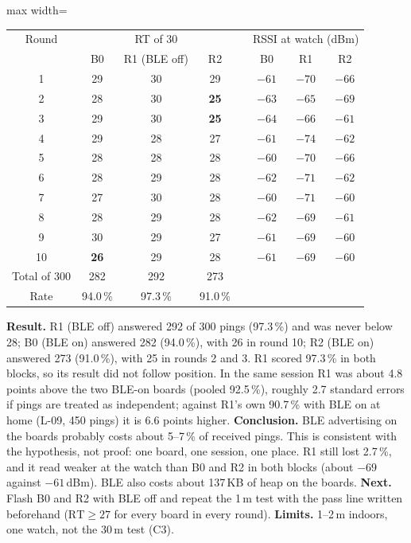 \IfFileExists{IEEEtran.cls}{\documentclass[conference]{IEEEtran}}{\documentclass[10pt,twocolumn]{article}}
\newcommand{\fitcol}[1]{\begin{adjustbox}{max width=\columnwidth}#1\end{adjustbox}}
\begin{document}
\begin{center}\footnotesize\setlength{\tabcolsep}{4pt}
\fitcol{\begin{tabular}{@{}c ccc c ccc@{}}
\toprule
Round & \multicolumn{3}{c}{RT of 30} & & \multicolumn{3}{c}{RSSI at watch (dBm)}\\
 & B0 & R1 (BLE off) & R2 & & B0 & R1 & R2\\
\midrule
1 & 29 & 30 & 29 & & $-61$ & $-70$ & $-66$\\
2 & 28 & 30 & \textbf{25} & & $-63$ & $-65$ & $-69$\\
3 & 29 & 30 & \textbf{25} & & $-64$ & $-66$ & $-61$\\
4 & 29 & 28 & 27 & & $-61$ & $-74$ & $-62$\\
5 & 28 & 28 & 28 & & $-60$ & $-70$ & $-66$\\
\midrule
6 & 28 & 29 & 28 & & $-62$ & $-71$ & $-62$\\
7 & 27 & 30 & 28 & & $-60$ & $-71$ & $-60$\\
8 & 28 & 29 & 28 & & $-62$ & $-69$ & $-61$\\
9 & 30 & 29 & 27 & & $-61$ & $-69$ & $-60$\\
10 & \textbf{26} & 29 & 28 & & $-61$ & $-69$ & $-60$\\
\midrule
Total of 300 & 282 & 292 & 273 & & & & \\
Rate & 94.0\,\% & 97.3\,\% & 91.0\,\% & & & & \\
\bottomrule
\end{tabular}}
\end{center}
\textbf{Result.} R1 (BLE off) answered 292 of 300 pings (97.3\,\%) and was never below 28; B0 (BLE on) answered 282 (94.0\,\%), with 26 in round 10; R2 (BLE on) answered 273 (91.0\,\%), with 25 in rounds 2 and 3. R1 scored 97.3\,\% in both blocks, so its result did not follow position. In the same session R1 was about 4.8 points above the two BLE-on boards (pooled 92.5\,\%), roughly 2.7 standard errors if pings are treated as independent; against R1's own 90.7\,\% with BLE on at home (L-09, 450 pings) it is 6.6 points higher. \textbf{Conclusion.} BLE advertising on the boards probably costs about 5--7\,\% of received pings. This is consistent with the hypothesis, not proof: one board, one session, one place. R1 still lost 2.7\,\%, and it read weaker at the watch than B0 and R2 in both blocks (about $-69$ against $-61$\,dBm). BLE also costs about 137\,KB of heap on the boards. \textbf{Next.} Flash B0 and R2 with BLE off and repeat the 1\,m test with the pass line written beforehand ($\mathrm{RT}\ge 27$ for every board in every round). \textbf{Limits.} 1--2\,m indoors, one watch, not the 30\,m test (C3).
\end{document}
